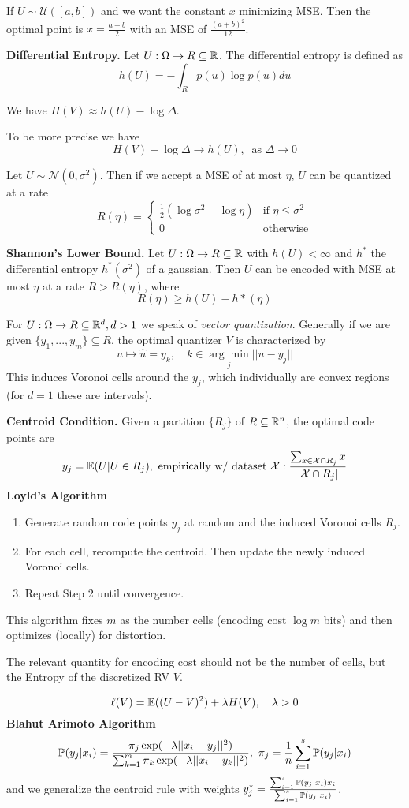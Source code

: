 If \(U \sim \mathcal{U}([a, b])\) and we want the constant \(x\) minimizing MSE. Then the optimal point is 
\(x = \frac{a+b}{2}\) with an MSE of \(\frac{(a+b)^2}{12}\).

\textbf{Differential Entropy.} Let \(U: \Omega \to R \subseteq \R\). The differential entropy is defined as
\[h(U) = - \int_{R}p(u) \log p(u) du\]

We have \(H(V) \approx h(U) - \log \Delta\).

To be more precise we have 
\[H(V) + \log \Delta \to h(U), \ \text{ as } \Delta \to 0\]

Let \(U \sim \mathcal{N}(0, \sigma^2)\). Then if we accept a MSE of at most \(\eta\), \(U\) can 
be quantized at a rate \[R(\eta) = \begin{cases}
    \frac{1}{2}(\log \sigma^2 - \log \eta) & \text{if } \eta \leq \sigma^2\\
    0 & \text{otherwise}
\end{cases}\]

\textbf{Shannon's Lower Bound.} Let \(U: \Omega \to R\subseteq \R\) with \(h(U) < \infty\) 
and \(h^*\) the differential entropy \(h^*(\sigma^2)\) of a gaussian. Then \(U\) can be encoded with 
MSE at most \(\eta\) at a rate \(R > R(\eta)\), where 
\[R(\eta) \geq h(U) - h*(\eta)\]

For \(U: \Omega \to R \subseteq \R^d, d>1\) we speak of \textit{vector quantization}. 
Generally if we are given \(\{y_1, ..., y_m\} \subseteq R\), the optimal quantizer \(V\) is characterized by 
\[u \mapsto \hat{u} = y_k, \quad k \in \underset{j}{\arg \min} ||u - y_j||\]
This induces Voronoi cells around the \(y_j\), which individually are convex regions (for \(d = 1\) these are intervals).

\textbf{Centroid Condition.} Given a partition \(\{R_j\}\) of \(R \subseteq \R^n\), the optimal code points are 
\[y_j = \E(U | U \in R_j), \text{ empirically w/ dataset }\mathcal{X}: 
\frac{\sum_{x \in \mathcal{X}\cap R_j}x}{|\mathcal{X}\cap R_j|}\]
\textbf{Loyld's Algorithm}
\begin{enumerate}
    \item Generate random code points \(y_j\) at random and the induced Voronoi cells \(R_j\).
    \item For each cell, recompute the centroid. Then update the newly induced Voronoi cells.
    \item Repeat Step 2 until convergence.
\end{enumerate}
This algorithm fixes \(m\) as the number cells (encoding cost \(\log m\) bits) 
and then optimizes (locally) for distortion.

The relevant quantity for encoding cost should not be the number of cells, 
but the Entropy of the discretized RV \(V\).

\[\ell(V) = \E((U-V)^2) + \lambda H(V), \quad \lambda > 0\]
\textbf{Blahut Arimoto Algorithm} 
\[\P(y_j|x_i) = \frac{\pi_j \exp(-\lambda||x_i-y_j||^2)}{\sum_{k = 1}^m \pi_k \exp(-\lambda||x_i-y_k||^2)}, \ \pi_j = \frac{1}{n}\sum_{i = 1}^s \P(y_j|x_i)\]
and we generalize the centroid rule with weights \(y_j^* = \frac{\sum_{i = 1}^s \P(y_j|x_i)x_i}{\sum_{i = 1}^s \P(y_j|x_i)}\).
